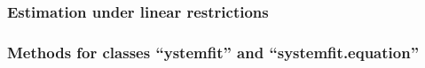 \documentclass[12pt,english]{scrartcl}
\begin{document}
\subsubsection{Estimation under linear restrictions}
% 
% 

\subsubsection{Methods for classes ``ystemfit'' and ``systemfit.equation''}
% 
% 
\end{document}
